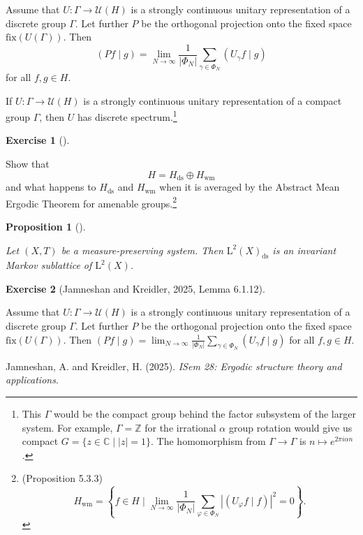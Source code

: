 \documentclass[
  british,
]{article}
\newlength{\cslhangindent}
\newenvironment{CSLReferences}[2] %
 {\begin{list}{}{%
  \setlength{\itemindent}{0pt}
  \setlength{\leftmargin}{0pt}
  \setlength{\parsep}{0pt}
  \ifodd #1
   \setlength{\leftmargin}{\cslhangindent}
   \setlength{\itemindent}{-1\cslhangindent}
  \fi
  \setlength{\itemsep}{#2\baselineskip}}}
 {\end{list}}
\theoremstyle{definition}
\newtheorem{exercise}{Exercise}[section]
\theoremstyle{definition}
\theoremstyle{plain}
\newtheorem{proposition}{Proposition}[section]
\theoremstyle{remark}
\newcommand{\AmenableGroup}{{\Gamma}}
\newcommand{\AmenableGroupElement}{{\gamma}}
\newcommand{\Folner}[1][\vphantom{}]{{\Phi}_{#1}}
\newcommand{\Group}{{\Gamma}}
\newcommand{\HilbertSpace}{{H}}
\begin{document}
Assume that \(U:\AmenableGroup\rightarrow\mathscr{U}(\HilbertSpace)\) is
a strongly continuous unitary representation of a discrete group
\(\AmenableGroup\). Let further \(P\) be the orthogonal projection onto
the fixed space \(\text{fix}(U(\AmenableGroup))\). Then
\[(Pf\mid g)=\lim_{N\rightarrow\infty}\frac{1}{|\Folner[N]|}\sum_{\AmenableGroupElement\in\Folner[N]}(U_\AmenableGroupElement f\mid g)\]
for all \(f,g\in\HilbertSpace\).

If \(U:\AmenableGroup\rightarrow\mathscr{U}(\HilbertSpace)\) is a
strongly continuous unitary representation of a compact group
\(\AmenableGroup\), then \(U\) has discrete spectrum.\footnote{This
  \(\AmenableGroup\) would be the compact group behind the factor
  subsystem of the larger system. For example,
  \(\AmenableGroup=\mathbb{Z}\) for the irrational \(\alpha\) group
  rotation would give us compact \(G=\{z\in\mathbb{C}\mid|z|=1\}\). The
  homomorphism from \(\AmenableGroup\rightarrow \Group\) is
  \(n\mapsto e^{2\pi i\alpha n}\).}

\begin{exercise}[]\protect\hypertarget{exr-AmenableAbstractMeanErgodic}{}\label{exr-AmenableAbstractMeanErgodic}

Show that
\[\HilbertSpace=\HilbertSpace_\text{ds}\oplus \HilbertSpace_\text{wm} \]
and what happens to \(\HilbertSpace_\text{ds}\) and
\(\HilbertSpace_\text{wm}\) when it is averaged by the Abstract Mean
Ergodic Theorem for amenable groups.\footnote{(Proposition
  5.3.3)\[\HilbertSpace_\text{wm}=\left\{f\in \HilbertSpace\mid \lim_{N\rightarrow\infty}\frac{1}{|\Folner[N]|}\sum_{\varphi\in\Folner[N]}|(U_\varphi f\mid f)|^2=0  \right\}. \]}

\end{exercise}

\begin{proposition}[]\protect\hypertarget{prp-DSInvariantMarkov}{}\label{prp-DSInvariantMarkov}

Let \((X,T)\) be a measure-preserving system. Then
\(\text{L}^2(X)_\text{ds}\) is an invariant Markov sublattice of
\(\text{L}^2(X)\).

\end{proposition}

\begin{exercise}[{Jamneshan and Kreidler, 2025, Lemma
6.1.12}]\protect\hypertarget{exr-ISem28exr6112}{}\label{exr-ISem28exr6112}

Assume that \(U:\AmenableGroup\rightarrow\mathscr{U}(\HilbertSpace)\) is
a strongly continuous unitary representation of a discrete group
\(\AmenableGroup\). Let further \(P\) be the orthogonal projection onto
the fixed space \(\text{fix}(U(\AmenableGroup))\). Then
\((Pf\mid g)=\lim_{N\rightarrow\infty}\frac{1}{|\Folner[N]|}\sum_{\AmenableGroupElement\in\Folner[N]}(U_\AmenableGroupElement f\mid g)\)
for all \(f,g\in\HilbertSpace\).

\end{exercise}

\protect{}\label{refs}
\begin{CSLReferences}{1}{0}
Jamneshan, A. and Kreidler, H. (2025). \emph{ISem 28: Ergodic structure
theory and applications}.

\end{CSLReferences}
\end{document}
